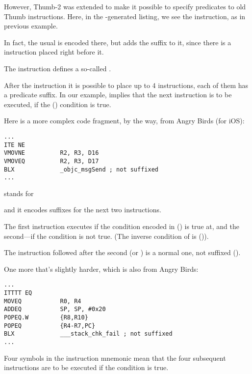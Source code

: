 
However, Thumb-2 was extended to make it possible to specify predicates to old Thumb instructions.
Here, in the \IDA-generated listing, we see the  instruction, as in previous example.

In fact, the usual  is encoded there, but \IDA adds the  suffix to it, 
since there is a  instruction placed right before it.

\label{ARM_Thumb_IT}
The  instruction defines a so-called . 

After the instruction it is possible to place up to 4 instructions, 
each of them has a predicate suffix.
In our example,  implies that the next instruction is to be executed, if the  () condition is true.

Here is a more complex code fragment, by the way, from Angry Birds (for iOS):

\begin{lstlisting}[caption=Angry Birds Classic,style=customasmARM]
...
ITE NE
VMOVNE          R2, R3, D16
VMOVEQ          R2, R3, D17
BLX             _objc_msgSend ; not suffixed
...
\end{lstlisting}

 stands for  

and it encodes suffixes for the next two instructions.

The first instruction executes if the condition encoded in  () is true at, and the second---if the condition is not true.
(The inverse condition of  is  ()).

The instruction followed after the second  (or ) is a normal one, not suffixed ().

One more that's slightly harder, which is also from Angry Birds:

\begin{lstlisting}[caption=Angry Birds Classic,style=customasmARM]
...
ITTTT EQ
MOVEQ           R0, R4
ADDEQ           SP, SP, #0x20
POPEQ.W         {R8,R10}
POPEQ           {R4-R7,PC}
BLX             ___stack_chk_fail ; not suffixed
...
\end{lstlisting}

Four  symbols in the instruction mnemonic mean that the four subsequent instructions are to be executed if the condition is true.


